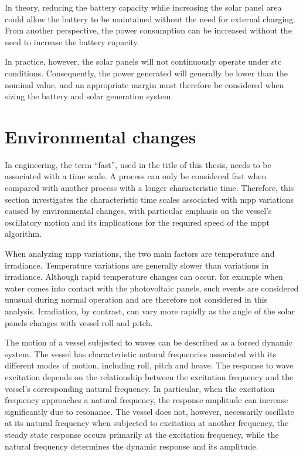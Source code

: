 In theory, reducing the battery capacity while increasing the solar panel area could allow the battery to be maintained without the need for external charging. 
From another perspective, the power consumption can be increased without the need to increase the battery capacity.

In practice, however, the solar panels will not continuously operate under \ac{stc} conditions. Consequently, the power generated will generally be lower than the nominal value, and an appropriate margin must therefore be considered when sizing the battery and solar generation system.



\section{Environmental changes}

In engineering, the term ``fast'', used in the title of this thesis, needs to be associated with a time scale. A process can only be considered fast when compared with another process with a longer characteristic time. Therefore, this section investigates the characteristic time scales associated with \ac{mpp} variations caused by environmental changes, with particular emphasis on the vessel's oscillatory motion and its implications for the required speed of the \ac{mppt} algorithm.

When analyzing \ac{mpp} variations, the two main factors are temperature and irradiance. Temperature variations are generally slower than variations in irradiance. Although rapid temperature changes can occur, for example when water comes into contact with the photovoltaic panels, such events are considered unusual during normal operation and are therefore not considered in this analysis. Irradiation, by contrast, can vary more rapidly as the angle of the solar panels changes with vessel roll and pitch. 

The motion of a vessel subjected to waves can be described as a forced dynamic system. The vessel has characteristic natural frequencies associated with its different modes of motion, including roll, pitch and heave. The response to wave excitation depends on the relationship between the excitation frequency and the vessel's corresponding natural frequency. In particular, when the excitation frequency approaches a natural frequency, the response amplitude can increase significantly due to resonance. The vessel does not, however, necessarily oscillate at its natural frequency when subjected to excitation at another frequency, the steady state response occurs primarily at the excitation frequency, while the natural frequency determines the dynamic response and its amplitude.

